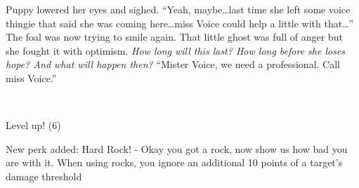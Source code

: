 Puppy lowered her eyes and sighed. ``Yeah, maybe\dots last time she left some voice thingie that said she was coming here\dots miss Voice could help a little with that\dots'' The foal was now trying to smile again. That little ghost was full of anger but she fought it with optimism. \emph{How long will this last? How long before she loses hope? And what will happen then?} ``Mister Voice, we need a professional. Call miss Voice.''


~\vfill

\begin{engnote}
    Level up! (6)
    
    New perk added: Hard Rock! - Okay you got a rock, now show us how bad you are with it. When using rocks, you ignore an additional 10 points of a target's damage threshold
\end{engnote}
